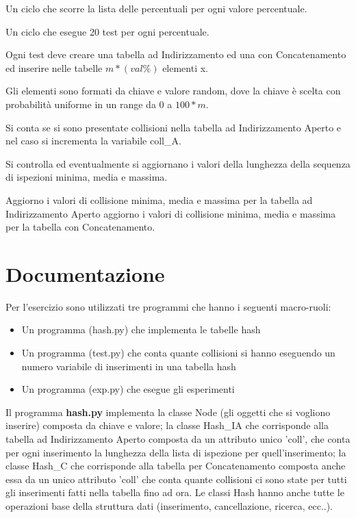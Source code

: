 \documentclass{article}
\begin{document}
Un ciclo che scorre la lista delle percentuali per ogni valore percentuale.


Un ciclo che esegue 20 test per ogni percentuale.


Ogni test deve creare una tabella ad Indirizzamento ed una con Concatenamento ed inserire nelle tabelle $m*(val\%)$ elementi x.


Gli elementi sono formati da chiave e valore random, dove la chiave è scelta con probabilità uniforme in un range da 0 a $100*m$.

Si conta se si sono presentate collisioni nella tabella ad Indirizzamento Aperto e nel caso si incrementa la variabile coll\_A.

Si controlla ed eventualmente si aggiornano i valori della lunghezza della sequenza di ispezioni minima, media e massima.


Aggiorno i valori di collisione minima, media e massima per la tabella ad Indirizzamento Aperto
aggiorno i valori di collisione minima, media e massima per la tabella con Concatenamento.
\newpage
\section{Documentazione}
Per l'esercizio sono utilizzati tre programmi che hanno i seguenti macro-ruoli:
\begin{itemize}
\item Un programma (hash.py) che implementa le tabelle hash
\item Un programma (test.py) che conta quante collisioni si hanno eseguendo un numero variabile di inserimenti in una tabella hash
\item Un programma (exp.py) che esegue gli esperimenti
\end{itemize}

Il programma \textbf{hash.py} implementa la classe Node (gli oggetti che si vogliono inserire) composta da chiave e valore; la classe Hash\_IA che corrisponde alla tabella ad Indirizzamento Aperto composta da un attributo unico 'coll', che conta per ogni inserimento la lunghezza della lista di ispezione per quell'inserimento; la classe Hash\_C che corrisponde alla tabella per Concatenamento composta anche essa da un unico attributo 'coll' che conta quante collisioni ci sono state per tutti gli inserimenti fatti nella tabella fino ad ora.
Le classi Hash hanno anche tutte le operazioni base della struttura dati (inserimento, cancellazione, ricerca, ecc..). 
\end{document}
